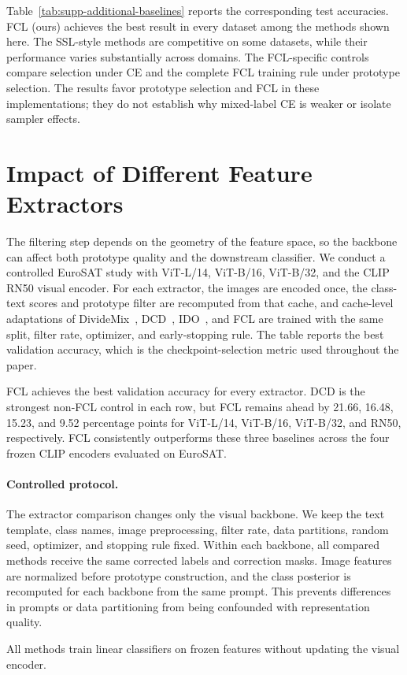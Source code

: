 \documentclass[10pt,twocolumn,letterpaper]{article}
\begin{document}
Table~\ref{tab:supp-additional-baselines} reports the corresponding test
accuracies. FCL (ours) achieves the best result in every dataset among the
methods shown here. The SSL-style methods are competitive on some datasets,
while their performance varies substantially across domains. The FCL-specific controls compare selection under CE and the complete FCL training rule under prototype selection. The results favor prototype selection and FCL in these implementations; they do not establish why mixed-label CE is weaker or isolate sampler effects.

\section{Impact of Different Feature Extractors}
The filtering step depends on the geometry of the feature space, so the
backbone can affect both prototype quality and the downstream classifier. We
conduct a controlled EuroSAT study with ViT-L/14, ViT-B/16, ViT-B/32, and the
CLIP RN50 visual encoder. For each extractor, the images are encoded once, the
class-text scores and prototype filter are recomputed from that cache, and
cache-level adaptations of DivideMix~\cite{li2020dividemix},
DCD~\cite{mu2025dcd}, IDO~\cite{zhang2025ido}, and FCL are trained with the same split, filter rate,
optimizer, and early-stopping rule. The table reports the best validation
accuracy, which is the checkpoint-selection metric used throughout the paper.

FCL achieves the best validation accuracy for every extractor. DCD is the
strongest non-FCL control in each row, but FCL remains ahead by 21.66, 16.48,
15.23, and 9.52 percentage points for ViT-L/14, ViT-B/16, ViT-B/32, and RN50,
respectively. FCL consistently outperforms these three baselines across the
four frozen CLIP encoders evaluated on EuroSAT.

\paragraph{Controlled protocol.}
The extractor comparison changes only the visual backbone. We keep the text
template, class names, image preprocessing, filter rate, data partitions,
random seed, optimizer, and stopping rule fixed. Within each backbone, all
compared methods receive the same corrected labels and correction masks.
Image features are normalized
before prototype construction, and the class posterior is recomputed for each
backbone from the same prompt. This prevents differences in prompts or data
partitioning from being confounded with representation quality.

All methods train linear classifiers on frozen features without updating the
visual encoder.

{
    \small
    
    
}
\end{document}
